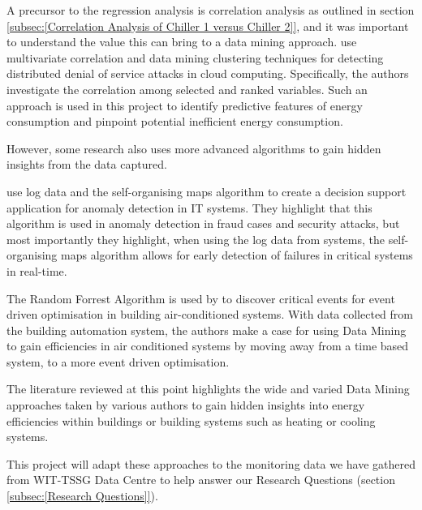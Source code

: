 \documentclass[12pt]{scrartcl}
\begin{document}
A precursor to the regression analysis is correlation analysis as outlined in section \ref{subsec:[Correlation Analysis of Chiller 1 versus Chiller 2]}, and it was important to understand the value this can bring to a data mining approach. \citet{13375977120180401} use multivariate correlation and data mining clustering techniques for detecting distributed denial of service attacks in cloud computing. Specifically, the authors investigate the correlation among selected and ranked variables. Such an approach is used in this project to identify predictive features of energy consumption and pinpoint potential inefficient energy consumption.    

However, some research also uses more advanced algorithms to gain hidden insights from the data captured. 

\citet{13090171620180801} use log data and the self-organising maps algorithm to create a decision support application for anomaly detection in IT systems. They highlight that this algorithm is used in anomaly detection in fraud cases and security attacks, but most importantly they highlight, when using the log data from systems, the self-organising maps algorithm allows for early detection of failures in critical systems in real-time. 

The Random Forrest Algorithm is used by \citet{WANG2017251} to discover critical events for event driven optimisation in building air-conditioned systems. With data collected from the building automation system, the authors make a case for using Data Mining to gain efficiencies in air conditioned systems by moving away from a time based system, to a more event driven optimisation.  

The literature reviewed at this point highlights the wide and varied Data Mining approaches taken by various authors to gain hidden insights into energy efficiencies within buildings or building systems such as heating or cooling systems. 

This project will adapt these approaches to the monitoring data we have gathered from WIT-TSSG Data Centre to help answer our Research Questions (section \ref{subsec:[Research Questions]}).   
\end{document}
